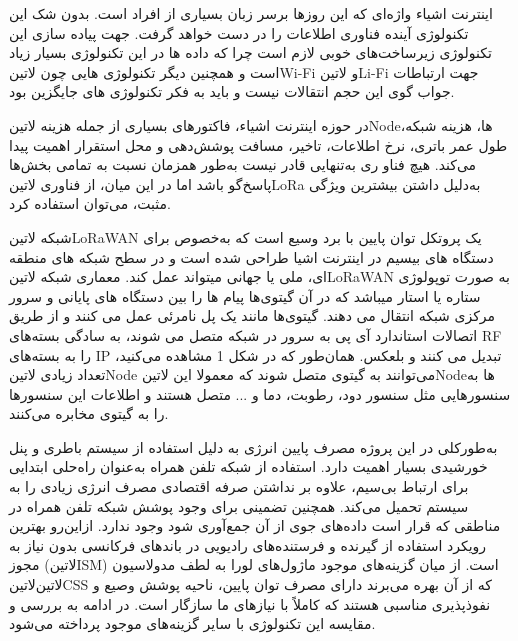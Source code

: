 اینترنت اشیاء واژه‌ای که این روزها برسر زبان بسیاری از افراد است. بدون شک این تکنولوژی آینده فناوری اطلاعات را در دست خواهد گرفت. جهت پیاده سازی این تکنولوژی زیرساخت‌های خوبی لازم است چرا که داده ها در این تکنولوژی بسیار زیاد است و همچنین دیگر تکنولوژی هایی چون ‌لاتین{Wi-Fi} و ‌لاتین{Li-Fi} جهت ارتباطات جواب گوی این حجم انتقالات نیست و باید به فکر تکنولوژی های جایگزین بود.

در حوزه اینترنت اشیاء، فاکتورهای بسیاری از جمله هزینه ‌لاتین{Node}ها، هزینه شبکه، طول عمر باتری، نرخ اطلاعات، تاخیر، مسافت پوشش‌دهی و محل استقرار اهمیت پیدا می‌کند. هیچ فناو
ری‌ به‌تنهایی قادر نیست به‌طور همزمان نسبت به تمامی بخش‌ها پاسخ‌گو باشد اما در این میان، از فناوری ‌لاتین{LoRa} به‌دلیل داشتن بیشترین ویژگی مثبت، می‌توان استفاده کرد.

شبکه ‌لاتین{LoRaWAN} یک پروتکل توان پایین با برد وسیع است که به‌خصوص برای دستگاه های بیسیم در اینترنت اشیا طراحی شده است و در سطح شبکه های منطقه ای، ملی یا جهانی میتواند عمل کند. معماری شبکه ‌لاتین{LoRaWAN} به صورت توپولوژی ستاره یا استار میباشد که در آن گیتوی‌ها پیام ها را بین دستگاه های پایانی و سرور مرکزی شبکه انتقال می دهند. گیتوی‌ها مانند یک پل نامرئی عمل می کنند و از طریق اتصالات استاندارد آی پی به سرور در شبکه متصل می شوند، به سادگی بسته‌های RF را به بسته‌های IP تبدیل می کنند و بلعکس. همان‌طور که در شکل 1 مشاهده می‌کنید، تعداد زیادی ‌لاتین{Node} می‌توانند به گیتوی متصل شوند که معمولا این ‌لاتین{Node}ها به سنسورهایی مثل سنسور دود، رطوبت، دما و ... متصل هستند و اطلاعات این سنسورها را به گیتوی مخابره می‌کنند.

به‌طورکلی در این پروژه مصرف پایین انرژی به دلیل استفاده از سیستم باطری و پنل خورشیدی بسیار اهمیت دارد. استفاده از شبکه تلفن همراه به‌عنوان راه‌حلی ابتدایی برای ارتباط بی‌سیم، علاوه بر نداشتن صرفه اقتصادی مصرف انرژی زیادی را به سیستم تحمیل می‌کند. همچنین تضمینی برای وجود پوشش شبکه تلفن همراه در مناطقی که قرار است داده‌های جوی از آن جمع‌آوری شود وجود ندارد. ازاین‌رو بهترین رویکرد استفاده از گیرنده و فرستنده‌های رادیویی در باندهای فرکانسی بدون نیاز به مجوز (‌لاتین{ISM}) است. از میان گزینه‌های موجود ماژول‌های لورا به لطف مدولاسیون ‌لاتین{‌لاتین{CSS}} که از آن بهره می‌برند دارای مصرف توان پایین، ناحیه پوشش وصیع و نفوذپذیری مناسبی هستند که کاملاً با نیازهای ما سازگار است. در ادامه به بررسی و مقایسه این تکنولوژی با سایر گزینه‌های موجود پرداخته می‌شود.

